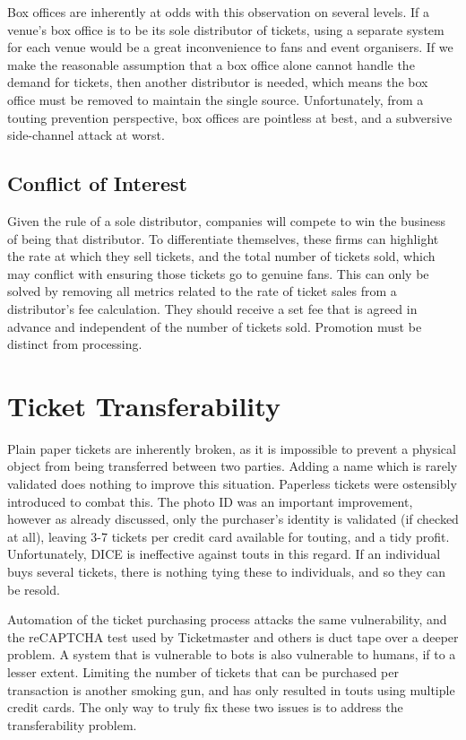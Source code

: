 \documentclass[12pt]{bhamdissertation}
\begin{document}
Box offices are inherently at odds with this observation on several levels. If a venue's box office is to be its sole distributor of tickets, using a separate system for each venue would be a great inconvenience to fans and event organisers. If we make the reasonable assumption that a box office alone cannot handle the demand for tickets, then another distributor is needed, which means the box office must be removed to maintain the single source. Unfortunately, from a touting prevention perspective, box offices are pointless at best, and a subversive side-channel attack at worst.

\subsection{Conflict of Interest}

Given the rule of a sole distributor, companies will compete to win the business of being that distributor. To differentiate themselves, these firms can highlight the rate at which they sell tickets, and the total number of tickets sold, which may conflict with ensuring those tickets go to genuine fans. This can only be solved by removing all metrics related to the rate of ticket sales from a distributor's fee calculation. They should receive a set fee that is agreed in advance and independent of the number of tickets sold. Promotion must be distinct from processing.

\section{Ticket Transferability}

Plain paper tickets are inherently broken, as it is impossible to prevent a physical object from being transferred between two parties. Adding a name which is rarely validated does nothing to improve this situation. Paperless tickets were ostensibly introduced to combat this. The photo ID was an important improvement, however as already discussed, only the purchaser's identity is validated (if checked at all), leaving 3-7 tickets per credit card available for touting, and a tidy profit. Unfortunately, DICE is ineffective against touts in this regard. If an individual buys several tickets, there is nothing tying these to individuals, and so they can be resold.

Automation of the ticket purchasing process attacks the same vulnerability, and the reCAPTCHA test used by Ticketmaster and others is duct tape over a deeper problem. A system that is vulnerable to bots is also vulnerable to humans, if to a lesser extent. Limiting the number of tickets that can be purchased per transaction is another smoking gun, and has only resulted in touts using multiple credit cards. The only way to truly fix these two issues is to address the transferability problem.
\end{document}
